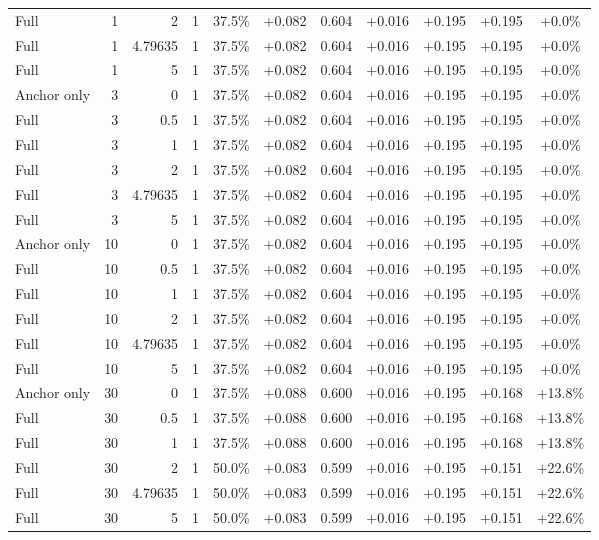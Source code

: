 \begin{table}[htbp]
\begin{tabular}{lrrrccccccc}
Full & 1 & 2 & 1 & 37.5\% & +0.082 & 0.604 & +0.016 & +0.195 & +0.195 & +0.0\% \\
Full & 1 & 4.79635 & 1 & 37.5\% & +0.082 & 0.604 & +0.016 & +0.195 & +0.195 & +0.0\% \\
Full & 1 & 5 & 1 & 37.5\% & +0.082 & 0.604 & +0.016 & +0.195 & +0.195 & +0.0\% \\
Anchor only & 3 & 0 & 1 & 37.5\% & +0.082 & 0.604 & +0.016 & +0.195 & +0.195 & +0.0\% \\
Full & 3 & 0.5 & 1 & 37.5\% & +0.082 & 0.604 & +0.016 & +0.195 & +0.195 & +0.0\% \\
Full & 3 & 1 & 1 & 37.5\% & +0.082 & 0.604 & +0.016 & +0.195 & +0.195 & +0.0\% \\
Full & 3 & 2 & 1 & 37.5\% & +0.082 & 0.604 & +0.016 & +0.195 & +0.195 & +0.0\% \\
Full & 3 & 4.79635 & 1 & 37.5\% & +0.082 & 0.604 & +0.016 & +0.195 & +0.195 & +0.0\% \\
Full & 3 & 5 & 1 & 37.5\% & +0.082 & 0.604 & +0.016 & +0.195 & +0.195 & +0.0\% \\
Anchor only & 10 & 0 & 1 & 37.5\% & +0.082 & 0.604 & +0.016 & +0.195 & +0.195 & +0.0\% \\
Full & 10 & 0.5 & 1 & 37.5\% & +0.082 & 0.604 & +0.016 & +0.195 & +0.195 & +0.0\% \\
Full & 10 & 1 & 1 & 37.5\% & +0.082 & 0.604 & +0.016 & +0.195 & +0.195 & +0.0\% \\
Full & 10 & 2 & 1 & 37.5\% & +0.082 & 0.604 & +0.016 & +0.195 & +0.195 & +0.0\% \\
Full & 10 & 4.79635 & 1 & 37.5\% & +0.082 & 0.604 & +0.016 & +0.195 & +0.195 & +0.0\% \\
Full & 10 & 5 & 1 & 37.5\% & +0.082 & 0.604 & +0.016 & +0.195 & +0.195 & +0.0\% \\
Anchor only & 30 & 0 & 1 & 37.5\% & +0.088 & 0.600 & +0.016 & +0.195 & +0.168 & +13.8\% \\
Full & 30 & 0.5 & 1 & 37.5\% & +0.088 & 0.600 & +0.016 & +0.195 & +0.168 & +13.8\% \\
Full & 30 & 1 & 1 & 37.5\% & +0.088 & 0.600 & +0.016 & +0.195 & +0.168 & +13.8\% \\
Full & 30 & 2 & 1 & 50.0\% & +0.083 & 0.599 & +0.016 & +0.195 & +0.151 & +22.6\% \\
Full & 30 & 4.79635 & 1 & 50.0\% & +0.083 & 0.599 & +0.016 & +0.195 & +0.151 & +22.6\% \\
Full & 30 & 5 & 1 & 50.0\% & +0.083 & 0.599 & +0.016 & +0.195 & +0.151 & +22.6\% \\

\end{tabular}
\end{table}
